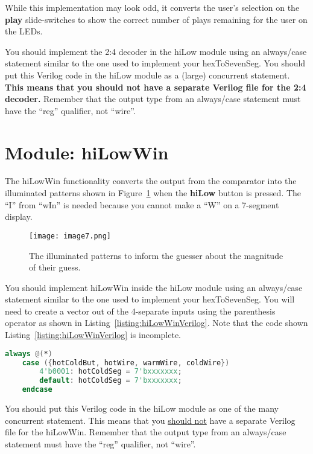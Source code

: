 While this implementation may look odd, it converts the user's selection
on the \textbf{play} slide-switches to show the correct number of plays
remaining for the user on the LEDs.

You should implement the 2:4 decoder in the hiLow module using an
always/case statement similar to the one used to implement your
hexToSevenSeg. You should put this Verilog code in the hiLow module as a
(large) concurrent statement. \textbf{This means that you should not
have a separate Verilog file for the 2:4 decoder.} Remember that the
output type from an always/case statement must have the ``reg''
qualifier, not ``wire''.


\section{Module: hiLowWin}

The hiLowWin functionality converts the output from the comparator into
the illuminated patterns shown in Figure~\ref{fig:hiLowWinDisplay} 
when the \textbf{hiLow}
button is pressed. The ``I'' from ``wIn'' is needed because you cannot
make a ``W'' on a 7-segment display.

\begin{figure}[ht]
\texttt{[image: image7.png]}
\caption{The illuminated patterns to inform the guesser about the
magnitude of their guess.}
\label{fig:hiLowWinDisplay}
\end{figure}

You should implement hiLowWin inside the hiLow module using an
always/case statement similar to the one used to implement your
hexToSevenSeg. You will need to create a vector out of the 4-separate
inputs using the parenthesis operator as shown in Listing~\ref{listing:hiLowWinVerilog}. 
Note that the code shown Listing~\ref{listing:hiLowWinVerilog} is incomplete.

\begin{lstlisting}[language=Verilog,
 caption={Starter code for the hiLowWin module.},
 label={listing:hiLowWinVerilog},
 frame=single]
 always @(*)
	case ({hotColdBut, hotWire, warmWire, coldWire})            
		4'b0001: hotColdSeg = 7'bxxxxxxx;				
		default: hotColdSeg = 7'bxxxxxxx;
	endcase  
 \end{lstlisting}

You should put this Verilog code in the hiLow module as one of the many
concurrent statement. This means that you \uline{should not} have a
separate Verilog file for the hiLowWin. Remember that the output type
from an always/case statement must have the ``reg'' qualifier, not
``wire''.


